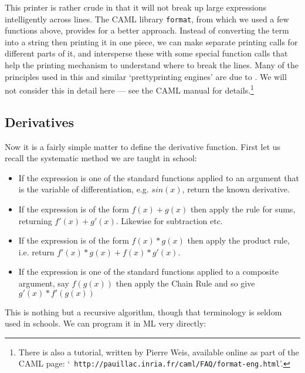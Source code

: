This printer is rather crude in that it will not break up large expressions
intelligently across lines. The CAML library {\tt format}, from which we used a
few functions above, provides for a better approach. Instead of converting the
term into a string then printing it in one piece, we can make separate printing
calls for different parts of it, and intersperse these with some special
function calls that help the printing mechanism to understand where to break
the lines. Many of the principles used in this and similar `prettyprinting
engines' are due to . We will not consider this in detail
here --- see the CAML manual for details.\footnote{There is also a tutorial,
written by Pierre Weis, available online as part of the CAML page: `{\tt
http://pauillac.inria.fr/caml/FAQ/format-eng.html}'.}

\subsection{Derivatives}

Now it is a fairly simple matter to define the derivative function. First let
us recall the systematic method we are taught in school:

\begin{itemize}

\item If the expression is one of the standard functions applied to an argument
that is the variable of differentiation, e.g. $sin(x)$, return the known
derivative.

\item If the expression is of the form $f(x) + g(x)$ then apply the rule
for sums, returning $f'(x) + g'(x)$. Likewise for subtraction etc.

\item If the expression is of the form $f(x) * g(x)$ then apply the
product rule, i.e. return $f'(x) * g(x) + f(x) * g'(x)$.

\item If the expression is one of the standard functions applied to a composite
argument, say $f(g(x))$ then apply the Chain Rule and so give
$g'(x) * f'(g(x))$

\end{itemize}

This is nothing but a recursive algorithm, though that terminology is seldom
used in schools. We can program it in ML very directly:

